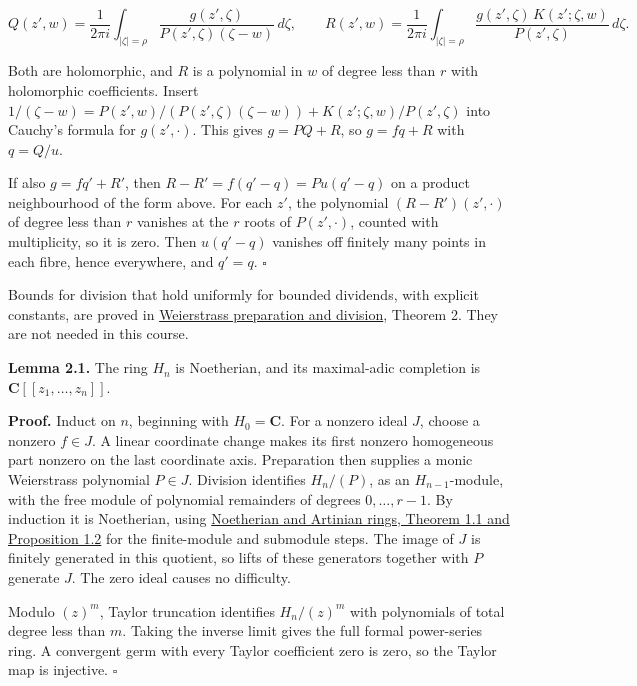 \documentclass[11pt]{article}
\begin{document}
\[
Q(z',w)=\frac1{2\pi i}\int_{|\zeta|=\rho}\frac{g(z',\zeta)}{P(z',\zeta)(\zeta-w)}\,d\zeta,\qquad
R(z',w)=\frac1{2\pi i}\int_{|\zeta|=\rho}\frac{g(z',\zeta)\,K(z';\zeta,w)}{P(z',\zeta)}\,d\zeta .
\]

Both are holomorphic, and \(R\) is a polynomial in \(w\) of degree less
than \(r\) with holomorphic coefficients. Insert
\(1/(\zeta-w)=P(z',w)/(P(z',\zeta)(\zeta-w))+K(z';\zeta,w)/P(z',\zeta)\)
into Cauchy's formula for \(g(z',\cdot)\). This gives \(g=PQ+R\), so
\(g=fq+R\) with \(q=Q/u\).

If also \(g=fq'+R'\), then \(R-R'=f(q'-q)=Pu(q'-q)\) on a product
neighbourhood of the form above. For each \(z'\), the polynomial
\((R-R')(z',\cdot)\) of degree less than \(r\) vanishes at the \(r\)
roots of \(P(z',\cdot)\), counted with multiplicity, so it is zero. Then
\(u(q'-q)\) vanishes off finitely many points in each fibre, hence
everywhere, and \(q'=q\). \(\square\)

Bounds for division that hold uniformly for bounded dividends, with
explicit constants, are proved in
\href{https://github.com/KokunoYumeto/open-math-courses/blob/d18141573d82588960ab175843821f0b38ab8802/docs/courses/analytic-finiteness-and-preparation/src/weierstrass-preparation-and-division.md\#division-finite-generation-and-elementary-algebra}{Weierstrass
preparation and division}, Theorem 2. They are not needed in this
course.

\textbf{Lemma 2.1.} The ring \(H_n\) is Noetherian, and its maximal-adic
completion is \(\mathbf C[[z_1,\ldots,z_n]]\).

\textbf{Proof.} Induct on \(n\), beginning with \(H_0=\mathbf C\). For a
nonzero ideal \(J\), choose a nonzero \(f\in J\). A linear coordinate
change makes its first nonzero homogeneous part nonzero on the last
coordinate axis. Preparation then supplies a monic Weierstrass
polynomial \(P\in J\). Division identifies \(H_n/(P)\), as an
\(H_{n-1}\)-module, with the free module of polynomial remainders of
degrees \(0,\ldots,r-1\). By induction it is Noetherian, using \href{../../../../../../AG-CA/AG-CA-03.html\#1-three-ways-to-recognize-a-noetherian-module}{Noetherian and Artinian rings, Theorem 1.1 and Proposition 1.2} for the finite-module and submodule steps. The image of
\(J\) is finitely generated in this quotient, so lifts of these
generators together with \(P\) generate \(J\). The zero ideal causes no
difficulty.

Modulo \((z)^m\), Taylor truncation identifies \(H_n/(z)^m\) with
polynomials of total degree less than \(m\). Taking the inverse limit
gives the full formal power-series ring. A convergent germ with every
Taylor coefficient zero is zero, so the Taylor map is injective.
\(\square\)
\end{document}

